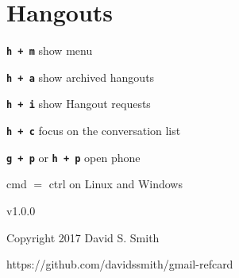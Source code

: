 \documentclass[11pt,letterpaper]{article}
\newcommand{\sck}[1]{\textbf{\texttt{#1}}}
\begin{document}
\section*{Hangouts}

\sck{h + m} \dotfill  show menu	

\sck{h + a} \dotfill  show archived hangouts	

\sck{h + i} \dotfill  show Hangout requests	

\sck{h + c} \dotfill focus on the conversation list	

\sck{g + p} or \sck{h + p} \dotfill open phone	



\vfill

cmd $=$ ctrl on Linux and Windows

\vspace{2em}




{\footnotesize v1.0.0

Copyright 2017 David S. Smith

https://github.com/davidssmith/gmail-refcard}
\end{document}
